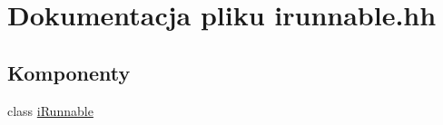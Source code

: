 \hypertarget{irunnable_8hh}{}\section{Dokumentacja pliku irunnable.\+hh}
\label{irunnable_8hh}
\subsection*{Komponenty}
\begin{DoxyCompactItemize}
\item 
class \hyperlink{classi_runnable}{i\+Runnable}
\end{DoxyCompactItemize}
